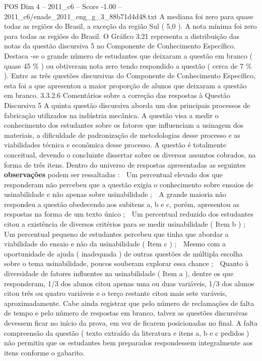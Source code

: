 \begin{textsample}{POS Dim 4 – 2011\_c6 – Score -1.00 – 2011\_c6/enade\_2011\_eng\_g\_3\_88b71d4d48.txt}
A mediana foi zero para quase todas as regiões do Brasil, a exceção da região Sul ( 5,0 ).
A nota mínima foi zero para todas as regiões do Brasil.
O Gráfico 3.21 representa a distribuição das notas da questão discursiva 5 no Componente de Conhecimento Específico.
Destaca -se o grande número de estudantes que deixaram a questão em branco ( quase 45 \% ) ou obtiveram nota zero tendo respondido a questão ( cerca de 7 \% ).
Entre as três questões discursivas do Componente de Conhecimento Específico, esta foi a que apresentou a maior proporção de alunos que deixaram a questão em branco. 3.3.2.6 Comentários sobre a correção das respostas à Questão Discursiva 5 A quinta questão discursiva aborda um dos principais processos de fabricação utilizados na indústria mecânica.
A questão visa a medir o conhecimento dos estudantes sobre os fatores que influenciam a usinagem dos materiais, a dificuldade de padronização de metodologias desse processo e as viabilidades técnica e econômica desse processo.
A questão é totalmente conceitual, devendo o concluinte dissertar sobre os diversos assuntos cobrados, na forma de três itens.
Dentro do universo de respostas apresentadas as seguintes \textbf{observações} podem ser ressaltadas :  Um percentual elevado dos que responderam não percebeu que a questão exigia o conhecimento sobre ensaios de usinabilidade e não apenas sobre usinabilidade ;  A grande maioria não respondeu a questão obedecendo aos subitens a, b e c, porém, apresentou as respostas na forma de um texto único ;  Um percentual reduzido dos estudantes citou a existência de diversos critérios para se medir usinabilidade ( Item b ) ;  Um percentual pequeno de estudantes percebeu que tinha que abordar a viabilidade do ensaio e não da usinabilidade ( Item c ) ;  Mesmo com a oportunidade de ajuda ( inadequada ) de outras questões de múltipla escolha sobre o tema usinabilidade, poucos souberam explorar essa chance ;  Quanto à diversidade de fatores influentes na usinabilidade ( Item a ), dentre os que responderam, 1/3 dos alunos citou apenas uma ou duas variáveis, 1/3 dos alunos citou três ou quatro variáveis e o terço restante citou mais sete varáveis, aproximadamente.
Cabe ainda registrar que pelo número de reclamações de falta de tempo e pelo número de respostas em branco, talvez as questões discursivas devessem ficar no início da prova, em vez de ficarem posicionadas no final.
A falta compreensão da questão ( texto extraído da literatura e itens a, b e c pedidos ) não permitiu que os estudantes bem preparados respondessem integralmente aos itens conforme o gabarito.

\end{textsample}
